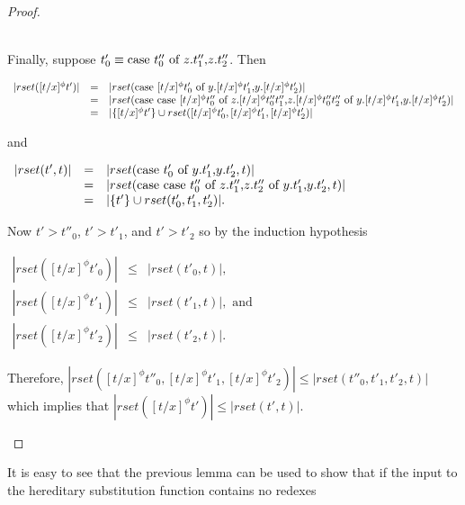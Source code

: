 \begin{proof}
\begin{itemize}
  \ \\
  Finally, suppose $t'_0 \equiv \mbox{case}\ t''_0\ \text{of}\ z\text{.}t''_1\text{,}z\text{.}t''_2$.  Then 
  \begin{center}
    \begin{math}
      \begin{array}{lll}
        |rset([t/x]^\phi t')| & = & |rset(\mbox{case}\ [t/x]^\phi t'_0\ \text{of}\ y\text{.}[t/x]^\phi t'_1\text{,}y\text{.}[t/x]^\phi t'_2)|\\
        & = & |rset(\mbox{case}\ \mbox{case}\ [t/x]^\phi t''_0\ \text{of}\ z\text{.}[t/x]^\phi t''_0 t''_1\text{,}z\text{.}[t/x]^\phi t''_0 t''_2\ \text{of}\ y\text{.}[t/x]^\phi t'_1\text{,}y\text{.}[t/x]^\phi t'_2)|\\
        & = & |\{[t/x]^\phi t'\} \cup rset([t/x]^\phi t'_0, [t/x]^\phi t'_1, [t/x]^\phi t'_2)|
      \end{array}
    \end{math}
  \end{center}
  and
  \begin{center}
    \begin{math}
      \begin{array}{lll}
        |rset(t',t)| & = & |rset(\mbox{case}\ t'_0\ \text{of}\ y\text{.}t'_1\text{,}y\text{.}t'_2,t)|\\
        & = & |rset(\mbox{case}\ \mbox{case}\ t''_0\ \text{of}\ z\text{.}t''_1\text{,}z\text{.}t''_2\ \text{of}\ y\text{.}t'_1\text{,}y\text{.}t'_2,t)|\\
        & = & |\{t'\} \cup rset(t'_0, t'_1,t'_2)|.
      \end{array}
    \end{math}
  \end{center}
  Now $t' > t''_0$, $t' > t'_1$, and $t' > t'_2$ so by the induction hypothesis
  \begin{center}
    \begin{math}
      \begin{array}{lll}
        |rset([t/x]^\phi t'_0)| & \leq & |rset(t'_0,t)|,\\
        |rset([t/x]^\phi t'_1)|  & \leq & |rset(t'_1,t)|, \text{ and }\\
        |rset([t/x]^\phi t'_2)|  & \leq & |rset(t'_2,t)|.
      \end{array}
    \end{math}
  \end{center}
  Therefore, $|rset([t/x]^\phi t''_0, [t/x]^\phi t'_1, [t/x]^\phi t'_2)| \leq |rset(t''_0, t'_1, t'_2, t)|$
  which implies that $|rset([t/x]^\phi t')| \leq |rset(t',t)|$.  
\end{itemize}
\end{proof}
It is easy to see that the previous lemma can be used to show that if
the input to the hereditary substitution function contains no redexes
